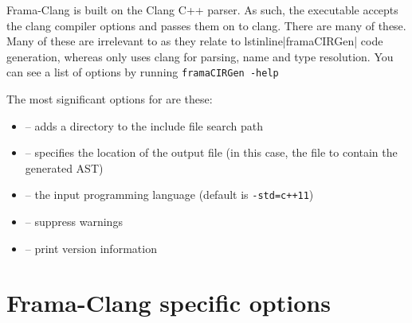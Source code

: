 Frama-Clang is built on the Clang C++ parser. 
As such, the \irg executable accepts the clang
compiler options and passes them on to clang. There are many of these.
Many of these are irrelevant to \fcl as they relate to lstinline|framaCIRGen|
code generation, whereas \fcl only uses clang for parsing, name
and type resolution.
You can see a list of options by running 
\lstinline|framaCIRGen -help|

The most significant options for  \irg are these:
\begin{itemize}
	\item {} -- adds a directory to the include file search path
	\item {} -- specifies the location of the output file (in this case, the file to contain the generated AST)
	\item {} -- the input programming language (default is \lstinline|-std=c++11|)
	\item {} -- suppress warnings
	\item {} -- print version information
\end{itemize}

\section{Frama-Clang specific options}


